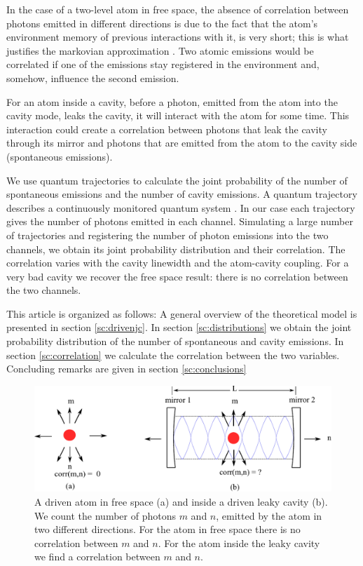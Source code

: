 \documentclass[epj,final]{svjour}
\begin{document}
In the case of a two-level atom in free space, the absence of
correlation between photons emitted in different directions is due to
the fact that the atom's environment memory of previous interactions
with it, is very short; this is what justifies the markovian
approximation \cite{daley2014quantum}. Two atomic emissions would be
correlated if one of the emissions stay registered in the environment
and, somehow, influence the second emission.

For an atom inside a cavity, before a photon, emitted from the atom
into the cavity mode, leaks the cavity, it will interact with the atom
for some time. This interaction could create a correlation between
photons that leak the cavity through its mirror and photons that are
emitted from the atom to the cavity side (spontaneous emissions).

We use quantum trajectories to calculate the joint probability of the
number of spontaneous emissions and the number of cavity emissions. A
quantum trajectory describes a continuously monitored quantum system
\cite{Carmichael1993Open}. In our case each trajectory gives the
number of photons emitted in each channel. Simulating a large number
of trajectories and registering the number of photon emissions into
the two channels, we obtain its joint probability distribution and
their correlation. The correlation varies with the cavity linewidth
and the atom-cavity coupling. For a very bad cavity we recover the
free space result: there is no correlation between the two channels.


This article is organized as follows: A general overview of the
theoretical model is presented in section \ref{sc:drivenjc}. In
section \ref{sc:distributions} we obtain the joint probability
distribution of the  number of spontaneous and cavity emissions. In
section \ref{sc:correlation} we calculate the correlation between the
two variables. Concluding remarks are given in section
\ref{sc:conclusions}
\begin{center}
\begin{figure}
\includegraphics[scale = 0.65]{newimagepaper.pdf}
\caption{A driven atom in free space (a) and inside a driven leaky
  cavity (b). We count the number of photons $m$ and $n$, emitted by
  the atom in two different directions. For the atom in free space
  there is no correlation between $m$ and $n$. For the atom inside the
  leaky cavity we find a correlation between $m$ and $n$.}\label{asa}
\end{figure}
\end{center}
\end{document}
